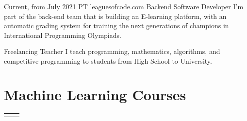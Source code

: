 \documentclass[
	10pt, %
]{FreemanCV}
\begin{document}
\begin{paracol}{2}


\jobentry
	{Current, from July 2021} %
	{PT} %
	{leaguesofcode.com} %
	{Backend Software Developer} %
	{I'm part of the back-end team that is building an E-learning platform, with an automatic grading system for training the next generations of champions in International Programming Olympiads.
    } %


\jobentry
	{} %
	{} %
	{Freelancing} %
	{Teacher} %
	{I teach programming, mathematics, algorithms, and competitive programming to students from High School to University.
    } %


\section{Machine Learning Courses} 




\begin{supertabular}{r l} %
	
	
	
	
\end{supertabular}



\end{paracol}
\end{document}
